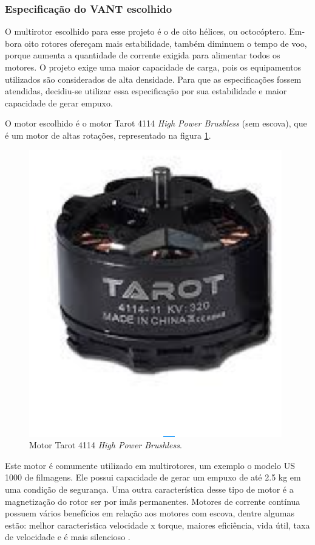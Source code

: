 \subsubsection{Especificação do VANT escolhido}

O multirotor escolhido para esse projeto é o de oito hélices, ou octocóptero. Em- bora oito rotores ofereçam mais estabilidade, também diminuem 
o tempo de voo, porque aumenta a quantidade de corrente exigida para alimentar todos os motores.  O projeto exige uma maior capacidade de carga, pois os equipamentos utilizados são considerados de alta densidade. Para que as especificações fossem atendidas, decidiu-se utilizar essa especificação por sua estabilidade e maior capacidade de gerar empuxo.

O motor escolhido é o motor Tarot 4114 \textit{High Power Brushless} (sem escova), que é um motor de altas rotações, representado na figura 
\ref{fig:tarot2}.

\begin{figure}[H]
    \centering
      \includegraphics[keepaspectratio=true,scale=0.5]{figuras/tarot2.eps}
    \caption{Motor Tarot 4114 \textit{High Power Brushless}. \cite{tarot}}
    \label{fig:tarot2}
\end{figure}
\vfill
Este motor é comumente utilizado em  multirotores, um exemplo o modelo US 1000 de filmagens. Ele possui capacidade de gerar um empuxo de até
2.5 kg em uma condição de segurança. Uma outra característica desse tipo de motor é a magnetização do rotor ser por imãs permanentes. Motores de corrente contínua 
possuem vários benefícios em relação aos motores com escova, dentre algumas estão: melhor característica velocidade x torque, maiores
eficiência, vida útil, taxa de velocidade e é mais silencioso \cite{nascimento}.


